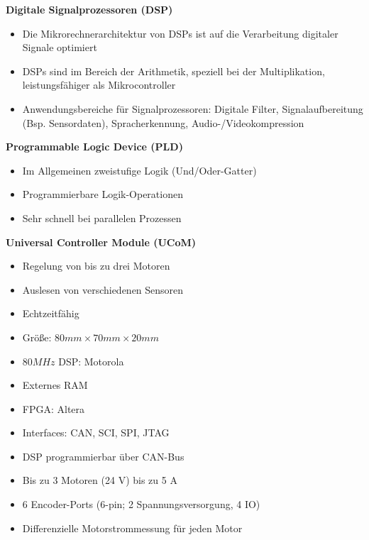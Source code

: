 \textbf{Digitale Signalprozessoren (DSP)}
\begin{itemize}
\item Die Mikrorechnerarchitektur von DSPs ist auf die Verarbeitung digitaler Signale optimiert
\item DSPs sind im Bereich der Arithmetik, speziell bei der Multiplikation, leistungsfähiger als Mikrocontroller
\item Anwendungsbereiche für Signalprozessoren: Digitale Filter, Signalaufbereitung (Bsp. Sensordaten), Spracherkennung, Audio-/Videokompression
\end{itemize}

\textbf{Programmable Logic Device (PLD)}
\begin{itemize}
\item Im Allgemeinen zweistufige Logik (Und/Oder-Gatter)
\item Programmierbare Logik-Operationen
\item Sehr schnell bei parallelen Prozessen
\end{itemize}

\textbf{Universal Controller Module (UCoM)}
\begin{itemize}
\item Regelung von bis zu drei Motoren
\item Auslesen von verschiedenen Sensoren
\item Echtzeitfähig
\item Größe: $80mm \times 70mm \times 20mm$
\item $80MHz$ DSP: Motorola
\item Externes RAM
\item FPGA: Altera
\item Interfaces: CAN, SCI, SPI, JTAG
\item DSP programmierbar über CAN-Bus
\item Bis zu 3 Motoren (24 V) bis zu 5 A
\item 6 Encoder-Ports (6-pin; 2 Spannungsversorgung, 4 IO)
\item Differenzielle Motorstrommessung für jeden Motor
\end{itemize}

